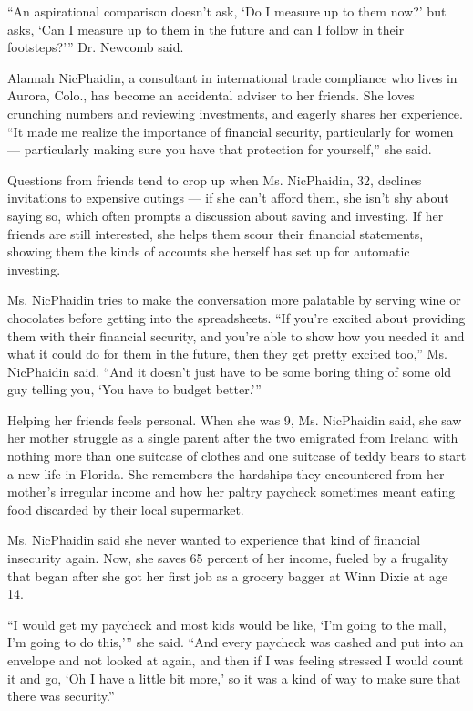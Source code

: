 ``An aspirational comparison doesn't ask, `Do I measure up to them now?'
but asks, `Can I measure up to them in the future and can I follow in
their footsteps?''' Dr. Newcomb said.

Alannah NicPhaidin, a consultant in international trade compliance who
lives in Aurora, Colo., has become an accidental adviser to her friends.
She loves crunching numbers and reviewing investments, and eagerly
shares her experience. ``It made me realize the importance of financial
security, particularly for women --- particularly making sure you have
that protection for yourself,'' she said.

Questions from friends tend to crop up when Ms. NicPhaidin, 32, declines
invitations to expensive outings --- if she can't afford them, she isn't
shy about saying so, which often prompts a discussion about saving and
investing. If her friends are still interested, she helps them scour
their financial statements, showing them the kinds of accounts she
herself has set up for automatic investing.

Ms. NicPhaidin tries to make the conversation more palatable by serving
wine or chocolates before getting into the spreadsheets. ``If you're
excited about providing them with their financial security, and you're
able to show how you needed it and what it could do for them in the
future, then they get pretty excited too,'' Ms. NicPhaidin said. ``And
it doesn't just have to be some boring thing of some old guy telling
you, `You have to budget better.'''

Helping her friends feels personal. When she was 9, Ms. NicPhaidin said,
she saw her mother struggle as a single parent after the two emigrated
from Ireland with nothing more than one suitcase of clothes and one
suitcase of teddy bears to start a new life in Florida. She remembers
the hardships they encountered from her mother's irregular income and
how her paltry paycheck sometimes meant eating food discarded by their
local supermarket.

Ms. NicPhaidin said she never wanted to experience that kind of
financial insecurity again. Now, she saves 65 percent of her income,
fueled by a frugality that began after she got her first job as a
grocery bagger at Winn Dixie at age 14.

``I would get my paycheck and most kids would be like, `I'm going to the
mall, I'm going to do this,''' she said. ``And every paycheck was cashed
and put into an envelope and not looked at again, and then if I was
feeling stressed I would count it and go, `Oh I have a little bit more,'
so it was a kind of way to make sure that there was security.''

